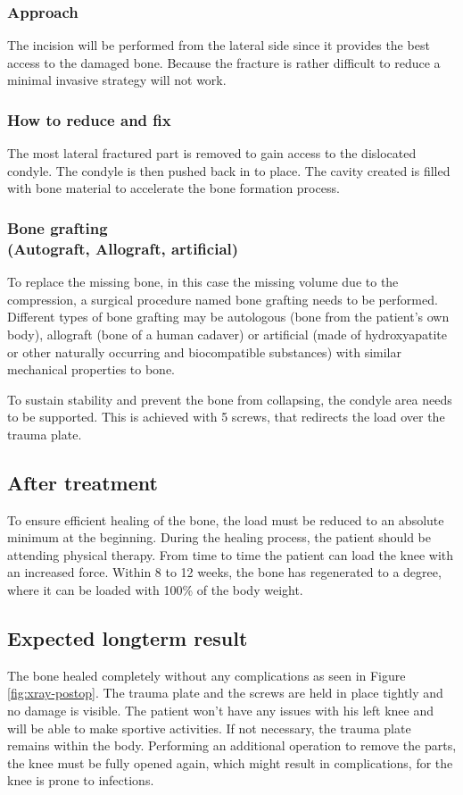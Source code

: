 \documentclass[a4paper]{article}
\begin{document}
\begin{multicols*}{2}
				\subsubsection{Approach}
					The incision will be performed from the lateral side since it provides the best access
					to the damaged bone. Because the fracture is rather difficult to reduce a minimal invasive
					strategy will not work.
					
				\subsubsection{How to reduce and fix}
					The most lateral fractured part is removed to gain access to the dislocated condyle.
					The condyle is then pushed back in to place. The cavity created is filled with bone
					material to accelerate the bone formation process. 
					
				\subsubsection{Bone grafting\\(Autograft, Allograft, artificial)}
					To replace the missing bone, in this case the missing volume due to the compression,
					a surgical procedure named bone grafting needs to be performed. Different types of
					bone grafting may be autologous (bone from the patient’s own body), allograft (bone
					of a human cadaver) or artificial (made of hydroxyapatite or other naturally occurring
					and biocompatible substances) with similar mechanical properties to bone.
					
					To sustain stability and prevent the bone from collapsing, the condyle area needs to
					be supported. This is achieved with 5 screws, that redirects the load over the trauma
					plate.

			\subsection{After treatment}
				To ensure efficient healing of the bone, the load must be reduced to an absolute minimum
				at the beginning. During the healing process, the patient should be attending physical
				therapy. From time to time the patient can load the knee with an increased force. Within
				8 to 12 weeks, the bone has regenerated to a degree, where it can be loaded with 100\%
				of the body weight.
			
			\subsection{Expected longterm result}
				The bone healed completely without any complications as seen in Figure \ref{fig:xray-postop}.
				The trauma plate and the screws are held in place tightly and no damage is visible. The
				patient won’t have any issues with his left knee and will be able to make sportive activities.
				If not necessary, the trauma plate remains within the body. Performing an additional operation
				to remove the parts, the knee must be fully opened again, which might result in complications,
				for the knee is prone to infections.
				

\end{multicols*}
\end{document}
